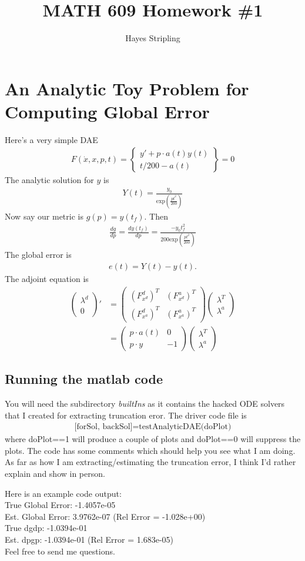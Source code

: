 \documentclass[11pt]{article}
\title{MATH 609 Homework \#1}
\author{Hayes Stripling}
\begin{document}
\section*{An Analytic Toy Problem for Computing Global Error}
Here's a very simple DAE
\begin{align*}
F(\dot{x},x,p,t)=\left\{\begin{array}{c}y'+p\cdot a(t)y(t)\\t/200-a(t)\end{array}\right\}=0
\end{align*}
The analytic solution for $y$ is
\begin{align*}
Y(t)=\frac{y_0}{\text{exp}\left(\frac{pt^2}{200}\right)}
\end{align*}
Now say our metric is $g(p)=y(t_f)$.  Then 
\begin{align*}
\frac{dg}{dp}=\frac{dy(t_f)}{dp}=\frac{-y_0t_f^2}{200\text{exp}\left(\frac{pt^2}{200}\right)}
\end{align*}
The global error is
\begin{align*}
e(t)=Y(t)-y(t).
\end{align*}
The adjoint equation is
\begin{align*}
\left(\begin{array}{c}\lambda^d\\0\end{array}\right)'&=\left(\begin{array}{cc}(F_{x^d}^d)^T & (F_{x^d}^a)^T\\(F_{x^a}^d)^T & (F_{x^a}^a)^T\end{array}\right)\left(\begin{array}{c}\lambda^T\\\lambda^a\end{array}\right)\\
&=\left(\begin{array}{cc}p\cdot a(t) & 0\\p\cdot y & -1\end{array}\right)\left(\begin{array}{c}\lambda^T\\\lambda^a\end{array}\right)
\end{align*}

\subsection*{Running the matlab code}
You will need the subdirectory \emph{builtIns} as it contains the hacked ODE solvers that I created for extracting truncation eror.  The driver code file is
\begin{align*}
\text{[forSol, backSol]=testAnalyticDAE(doPlot)}
\end{align*}
where doPlot==1 will produce a couple of plots and doPlot==0 will suppress the plots.  The code has some comments which should help you see what I am doing.  As far as how I am extracting/estimating the truncation error, I think I'd rather explain and show in person.

Here is an example code output:\\

True Global Error: -1.4057e-05\\
Est. Global Error: 3.9762e-07 (Rel Error = -1.028e+00)\\
True dgdp: -1.0394e-01\\
Est. dpgp: -1.0394e-01 (Rel Error = 1.683e-05)\\

Feel free to send me questions.
\end{document}
